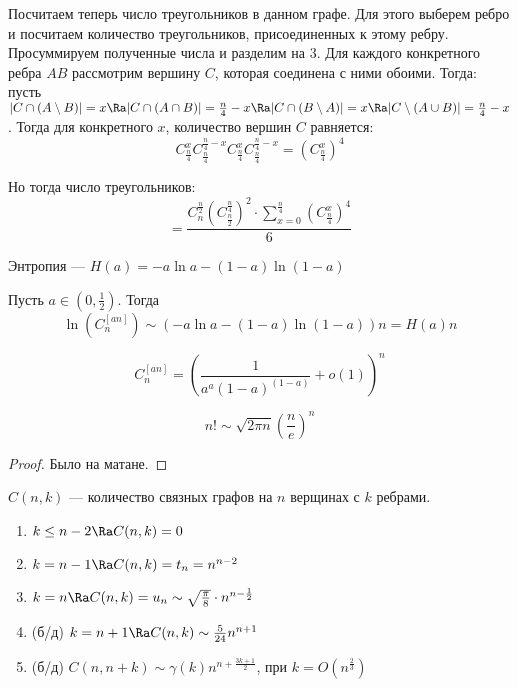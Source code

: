 Посчитаем теперь число треугольников в данном графе. Для этого выберем ребро и посчитаем количество треугольников, присоединенных к этому ребру. Просуммируем полученные числа и разделим на \(3\).
Для каждого конкретного ребра \(AB\) рассмотрим вершину \(C\), которая соединена с ними обоими. Тогда: пусть \(|C \cap (A \setminus B)| = x \Ra |C \cap (A \cap B)| = \frac{n}{4} - x \Ra |C \cap (B \setminus A)| = x \Ra |C \setminus (A \cup B)| = \frac{n}{4} - x\). Тогда для конкретного \(x\), количество вершин \(C\) равняется:
\[C_{\frac{n}{4}}^xC_{\frac{n}{4}}^{\frac{n}{4} - x}C_{\frac{n}{4}}^xC_{\frac{n}{4}}^{\frac{n}{4} - x} = \left(C_{\frac{n}{4}}^x\right)^4\]

Но тогда число треугольников:
\[= \frac{C_n^{\frac{n}{2}}\left(C_{\frac{n}{2}}^{\frac{n}{4}}\right)^2 \cdot \sum_{x = 0}^{\frac{n}{4}}\left(C_{\frac{n}{4}}^x\right)^4}{6}\]

\begin{definition}
    Энтропия --- \(H(a) = -a\ln a - (1 - a)\ln(1 - a)\)
\end{definition}

\begin{theorem}
    Пусть \(a \in \left(0, \frac{1}{2}\right)\). Тогда 
    \[\ln\left(C_n^{[an]}\right) \sim \left(-a\ln a - (1 - a)\ln(1 - a)\right)n = H(a)n\]
\end{theorem}

\begin{corollary}
    \[C_n^{[an]} = \left(\frac{1}{a^a(1-a)^{(1-a)}} + o(1)\right)^n\]
\end{corollary}

\begin{proposition}
    \[n! \sim \sqrt{2\pi n}\left(\frac{n}{e}\right)^n\]
\end{proposition}
\begin{proof}
    Было на матане.
\end{proof}

\begin{definition}
    \(C(n, k)\) --- количество связных графов на \(n\) верщинах с \(k\) ребрами.
\end{definition}
\begin{note}
    \begin{enumerate}
        \item \(k \le n - 2 \Ra C(n, k) = 0\)
        \item \(k = n - 1 \Ra C(n, k) = t_n = n^{n - 2}\)
        \item \(k = n \Ra C(n, k) = u_n \sim \sqrt{\frac{\pi}{8}}\cdot n^{n - \frac{1}{2}}\)
        \item (б/д) \(k = n + 1 \Ra C(n, k) \sim \frac{5}{24}n^{n + 1}\)
        \item (б/д) \(C(n, n + k) \sim \gamma(k)n^{n + \frac{3k + 1}{2}}\), при \(k = O\left(n^{\frac{2}{3}}\right)\)
    \end{enumerate}
\end{note}

